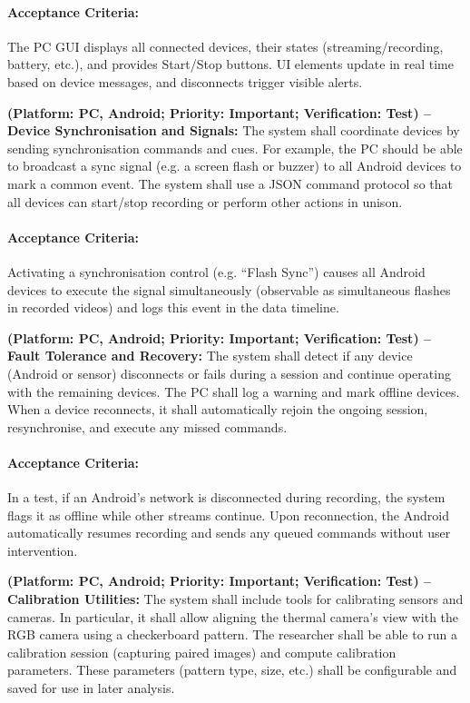 \begin{description}[style=unboxed,leftmargin=0cm]
    \paragraph{Acceptance Criteria:} The PC GUI displays all connected devices, their states (streaming/recording, battery, etc.), and provides Start/Stop buttons. UI elements update in real time based on device messages, and disconnects trigger visible alerts.

    \item[\textbf{FR7}] \textbf{(Platform: PC, Android; Priority: Important; Verification: Test) – Device Synchronisation and Signals:} The system shall coordinate devices by sending synchronisation commands and cues. For example, the PC should be able to broadcast a sync signal (e.g. a screen flash or buzzer) to all Android devices to mark a common event. The system shall use a JSON command protocol so that all devices can start/stop recording or perform other actions in unison.
    \paragraph{Acceptance Criteria:} Activating a synchronisation control (e.g. “Flash Sync”) causes all Android devices to execute the signal simultaneously (observable as simultaneous flashes in recorded videos) and logs this event in the data timeline.

    \item[\textbf{FR8}] \textbf{(Platform: PC, Android; Priority: Important; Verification: Test) – Fault Tolerance and Recovery:} The system shall detect if any device (Android or sensor) disconnects or fails during a session and continue operating with the remaining devices. The PC shall log a warning and mark offline devices. When a device reconnects, it shall automatically rejoin the ongoing session, resynchronise, and execute any missed commands.
    \paragraph{Acceptance Criteria:} In a test, if an Android’s network is disconnected during recording, the system flags it as offline while other streams continue. Upon reconnection, the Android automatically resumes recording and sends any queued commands without user intervention.

    \item[\textbf{FR9}] \textbf{(Platform: PC, Android; Priority: Important; Verification: Test) – Calibration Utilities:} The system shall include tools for calibrating sensors and cameras. In particular, it shall allow aligning the thermal camera’s view with the RGB camera using a checkerboard pattern. The researcher shall be able to run a calibration session (capturing paired images) and compute calibration parameters. These parameters (pattern type, size, etc.) shall be configurable and saved for use in later analysis.

\end{description}
